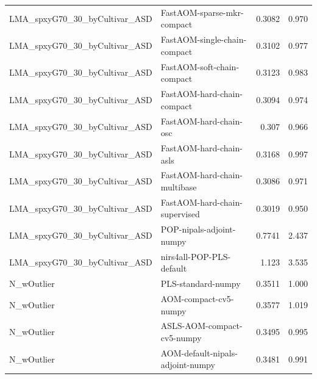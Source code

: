 \begin{landscape}
\begin{longtable}{L{8.0cm}L{9.5cm}rr}
LMA\_\allowbreak{}spxyG70\_\allowbreak{}30\_\allowbreak{}byCultivar\_\allowbreak{}ASD & FastAOM-\allowbreak{}sparse-\allowbreak{}mkr-\allowbreak{}compact & 0.3082 & 0.970 \\
LMA\_\allowbreak{}spxyG70\_\allowbreak{}30\_\allowbreak{}byCultivar\_\allowbreak{}ASD & FastAOM-\allowbreak{}single-\allowbreak{}chain-\allowbreak{}compact & 0.3102 & 0.977 \\
LMA\_\allowbreak{}spxyG70\_\allowbreak{}30\_\allowbreak{}byCultivar\_\allowbreak{}ASD & FastAOM-\allowbreak{}soft-\allowbreak{}chain-\allowbreak{}compact & 0.3123 & 0.983 \\
LMA\_\allowbreak{}spxyG70\_\allowbreak{}30\_\allowbreak{}byCultivar\_\allowbreak{}ASD & FastAOM-\allowbreak{}hard-\allowbreak{}chain-\allowbreak{}compact & 0.3094 & 0.974 \\
LMA\_\allowbreak{}spxyG70\_\allowbreak{}30\_\allowbreak{}byCultivar\_\allowbreak{}ASD & FastAOM-\allowbreak{}hard-\allowbreak{}chain-\allowbreak{}osc & 0.307 & 0.966 \\
LMA\_\allowbreak{}spxyG70\_\allowbreak{}30\_\allowbreak{}byCultivar\_\allowbreak{}ASD & FastAOM-\allowbreak{}hard-\allowbreak{}chain-\allowbreak{}asls & 0.3168 & 0.997 \\
LMA\_\allowbreak{}spxyG70\_\allowbreak{}30\_\allowbreak{}byCultivar\_\allowbreak{}ASD & FastAOM-\allowbreak{}hard-\allowbreak{}chain-\allowbreak{}multibase & 0.3086 & 0.971 \\
LMA\_\allowbreak{}spxyG70\_\allowbreak{}30\_\allowbreak{}byCultivar\_\allowbreak{}ASD & FastAOM-\allowbreak{}hard-\allowbreak{}chain-\allowbreak{}supervised & 0.3019 & 0.950 \\
LMA\_\allowbreak{}spxyG70\_\allowbreak{}30\_\allowbreak{}byCultivar\_\allowbreak{}ASD & POP-\allowbreak{}nipals-\allowbreak{}adjoint-\allowbreak{}numpy & 0.7741 & 2.437 \\
LMA\_\allowbreak{}spxyG70\_\allowbreak{}30\_\allowbreak{}byCultivar\_\allowbreak{}ASD & nirs4all-\allowbreak{}POP-\allowbreak{}PLS-\allowbreak{}default & 1.123 & 3.535 \\
N\_\allowbreak{}wOutlier & PLS-\allowbreak{}standard-\allowbreak{}numpy & 0.3511 & 1.000 \\
N\_\allowbreak{}wOutlier & AOM-\allowbreak{}compact-\allowbreak{}cv5-\allowbreak{}numpy & 0.3577 & 1.019 \\
N\_\allowbreak{}wOutlier & ASLS-\allowbreak{}AOM-\allowbreak{}compact-\allowbreak{}cv5-\allowbreak{}numpy & 0.3495 & 0.995 \\
N\_\allowbreak{}wOutlier & AOM-\allowbreak{}default-\allowbreak{}nipals-\allowbreak{}adjoint-\allowbreak{}numpy & 0.3481 & 0.991 \\

\end{longtable}
\end{landscape}
